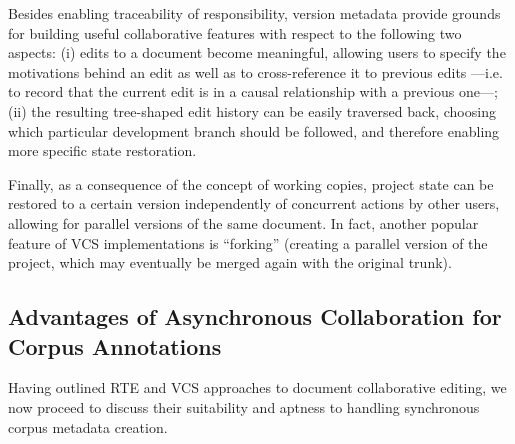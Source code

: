 \documentclass{sig-alternate}
\begin{document}
Besides enabling traceability of responsibility, version metadata provide grounds for building useful
collaborative features with respect to the following two aspects: (i) edits to a document become
meaningful, allowing users to specify the motivations behind an edit as well as to cross-reference
it to previous edits ---i.e. to record that the current edit is in a causal relationship with a
previous one---; (ii) the resulting tree-shaped edit history can be easily traversed back, choosing
which particular development branch should be followed, and therefore enabling more specific
state restoration.

Finally, as a consequence of the concept of working copies, project state can be restored
to a certain version independently of concurrent actions by other users, allowing for parallel
versions of the same document. In fact, another popular feature of VCS implementations
is ``forking'' (creating a parallel version of the project, which may eventually be merged
again with the original trunk).




\subsection{Advantages of Asynchronous Collaboration for Corpus Annotations}
\label{subsec:hybrid}

Having outlined RTE and VCS approaches to document collaborative editing, we now proceed to discuss
their suitability and aptness to handling synchronous corpus metadata creation.
\end{document}
